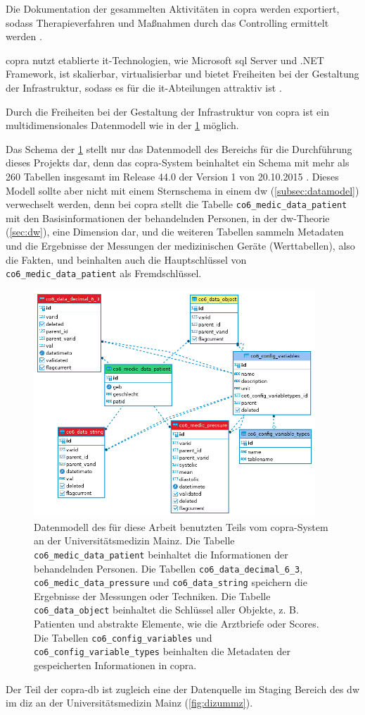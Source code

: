 Die Dokumentation der gesammelten Aktivitäten in \ac{copra} werden exportiert, sodass Therapieverfahren und Maßnahmen durch das Controlling ermittelt werden \cite{copra}.

\ac{copra} nutzt etablierte \ac{it}-Technologien, wie Microsoft \acs{sql} Server und .NET Framework, ist skalierbar, virtualisierbar und bietet Freiheiten bei der Gestaltung der Infrastruktur, sodass es für die \ac{it}-Abteilungen attraktiv ist \cite{copra}.

Durch die Freiheiten bei der Gestaltung der Infrastruktur von \ac{copra} ist ein multidimensionales Datenmodell wie in der \ref{fig:copraschema} möglich. 

Das Schema der \ref{fig:copraschema} stellt nur das Datenmodell des Bereichs für die Durchführung dieses Projekts dar, denn das \ac{copra}-System beinhaltet ein Schema mit mehr als 260 Tabellen insgesamt im Release 44.0 der Version 1 von 20.10.2015 \cite{copradoc}. Dieses Modell sollte aber nicht mit einem Sternschema in einem \ac{dw} (\ref{subsec:datamodel}) verwechselt werden, denn bei \ac{copra} stellt die Tabelle \texttt{co6\_medic\_data\_patient} mit den Basisinformationen der behandelnden Personen, in der \ac{dw}-Theorie (\ref{sec:dw}), eine Dimension dar, und die weiteren Tabellen sammeln Metadaten und die Ergebnisse der Messungen der medizinischen Geräte (Werttabellen), also die Fakten, und beinhalten auch die Hauptschlüssel von \texttt{co6\_medic\_data\_patient} als Fremdschlüssel.

\clearpage

\begin{figure}[ht]
	\centering
	\includegraphics[height=8.5cm]{figures/copra_data_model_data}
	\caption[Datenmodell von \acs{copra}]{Datenmodell des für diese Arbeit benutzten Teils vom \ac{copra}-System an der Universitätsmedizin Mainz. Die Tabelle \texttt{co6\_medic\_data\_patient} beinhaltet die Informationen der behandelnden Personen. Die Tabellen \texttt{co6\_data\_decimal\_6\_3}, \texttt{co6\_medic\_data\_pressure} und \texttt{co6\_data\_string} speichern die Ergebnisse der Messungen oder Techniken. Die Tabelle \texttt{co6\_data\_object} beinhaltet die Schlüssel aller Objekte, z. B. Patienten und abstrakte Elemente, wie die Arztbriefe oder Scores.
	Die Tabellen \texttt{co6\_config\_variables} und \texttt{co6\_config\_variable\_types} beinhalten die Metadaten der gespeicherten Informationen in \ac{copra}.}
	\label{fig:copraschema}
\end{figure}

Der Teil der \ac{copra}-\ac{db} ist zugleich eine der Datenquelle im Staging Bereich des \ac{dw}  im \ac{diz} an der Universitätsmedizin Mainz (\ref{fig:dizummz}).